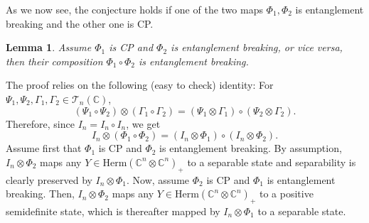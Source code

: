 \documentclass[11pt]{article}
\makeatletter
\newcommand{\C}{\ensuremath{\mathbb{C}}} %
\newcommand{\MT}{{\mathcal T}}
\newcommand{\Herm}{\mathrm{Herm}}
\newcommand{\ot}{\otimes}
\theoremstyle{plain}
\newtheorem{lemma}[satz]{Lemma}
\renewenvironment{proof}[1][\proofname]{%
  \par
  \pushQED{}%
  \normalfont
  \topsep6\p@\@plus6\p@
  \trivlist
  \item[\hskip\labelsep\itshape #1\@addpunct{.}]%
}{%
  \popQED
  \endtrivlist
}
\makeatother
\begin{document}
As we now see, the conjecture holds if one of the two maps $\Phi_1, \Phi_2$ is entanglement breaking and the other one is CP.

\begin{lemma}\label{lem:conj-holds}
Assume $\Phi_1$ is CP and $\Phi_2$ is entanglement breaking, or vice versa, then their composition $\Phi_1\circ \Phi_2$ is entanglement breaking.
\end{lemma}

\begin{proof}
    The proof relies on the following (easy to check) identity: For $\Psi_1,\Psi_2,\Gamma_1,\Gamma_2\in\MT_n(\C)$,
     $$(\Psi_1\circ\Psi_2)\ot(\Gamma_1\circ\Gamma_2)=(\Psi_1\ot\Gamma_1)\circ(\Psi_2\ot\Gamma_2).$$
  Therefore, since $I_n=I_n\circ I_n$, we get 
  $$I_n\ot(\Phi_1\circ\Phi_2)=(I_n\ot\Phi_1)\circ(I_n\ot\Phi_2).$$
 Assume first that $\Phi_1$ is CP and $\Phi_2$ is entanglement breaking.   By assumption, $I_n\ot\Phi_2$ maps any $Y\in\Herm(\C^n\ot\C^n)_+$ to a separable state and separability is clearly preserved by $I_n\ot\Phi_1$. Now, assume $\Phi_2$ is CP and $\Phi_1$ is entanglement breaking. Then, 
$I_n\ot \Phi_2$ maps  any $Y\in\Herm(\C^n\ot\C^n)_+$ to a positive semidefinite state, which is thereafter mapped by $I_n\ot\Phi_1$ to a separable state. 
  \end{proof}
\end{document}
